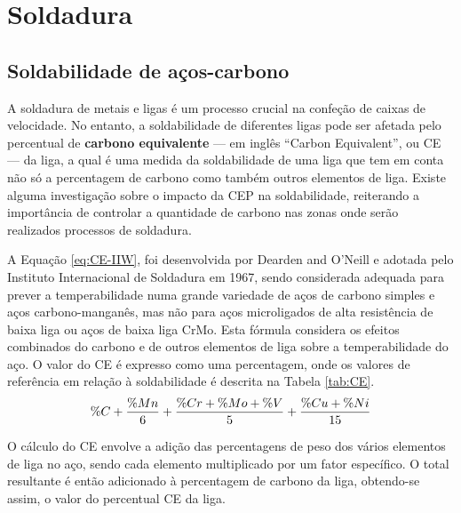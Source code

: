 \section{Soldadura}\label{sec:soldadura}
\subsection{Soldabilidade de aços-carbono}\label{ssec:soldadura-soldabilidade}

A soldadura de metais e ligas é um processo crucial na confeção de caixas de velocidade. No entanto, a soldabilidade de diferentes ligas pode ser afetada pelo percentual de  \textbf{carbono equivalente} — em inglês “Carbon Equivalent”, ou CE — da liga, a qual é uma medida da soldabilidade de uma liga que tem em conta não só a percentagem de carbono como também outros elementos de liga. Existe alguma investigação sobre o impacto da CEP na soldabilidade, reiterando a importância de controlar a quantidade de carbono nas zonas onde serão realizados processos de soldadura.
\par
A Equação \ref{eq:CE-IIW}, foi desenvolvida por Dearden and O'Neill e adotada pelo Instituto Internacional de Soldadura em 1967, sendo considerada adequada para prever a temperabilidade numa grande variedade de aços de carbono simples e aços carbono-manganês, mas não para aços microligados de alta resistência de baixa liga ou aços de baixa liga CrMo. Esta fórmula considera os efeitos combinados do carbono e de outros elementos de liga sobre a temperabilidade do aço. O valor do CE é expresso como uma percentagem, onde os valores de referência em relação à soldabilidade é descrita na Tabela \ref{tab:CE}.
\vspace{5mm}
\begin{equation}
    \centering
    \label{eq:CE-IIW}
    \%C + \frac{\%Mn}{6}+\frac{\%Cr+\%Mo+\%V}{5}+\frac{\%Cu+\%Ni}{15}
\end{equation}
\vspace{5mm}
\par
O cálculo do CE envolve a adição das percentagens de peso dos vários elementos de liga no aço, sendo cada elemento multiplicado por um fator específico. O total resultante é então adicionado à percentagem de carbono da liga, obtendo-se assim, o valor do percentual CE da liga.
\par
